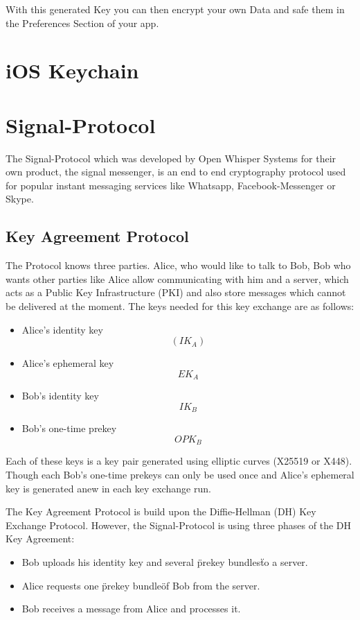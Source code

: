 \documentclass[12pt,oneside,a4paper,parskip]{scrbook}
\begin{document}
With this generated Key you can then encrypt your own Data and safe them in the Preferences Section of your app.

\section{iOS Keychain}


\section{Signal-Protocol}

The Signal-Protocol which was developed by Open Whisper Systems for their own product, the signal messenger, is an end to end cryptography protocol used for
popular instant messaging services like Whatsapp, Facebook-Messenger or Skype.

\parencite{cohn-gordon_formal_2017}
\newline

\subsection{Key Agreement Protocol}
The Protocol knows three parties. Alice, who would like to talk to Bob, Bob who wants other parties like Alice allow communicating with him and a server, which acts as a
Public Key Infrastructure (PKI) and also store messages which cannot be delivered at the moment. The keys needed for this key exchange are as follows:
 \begin{itemize}
   \item Alice's identity key \[  (IK_{A}) \]
   \item Alice's ephemeral key \[  {EK_{A}} \]
   \item Bob's identity key \[  {IK_{B}} \] 
   \item Bob's one-time prekey \[  {OPK_{B}} \]
 \end{itemize}

Each of these keys is a key pair generated using elliptic curves (X25519 or X448). Though each Bob's one-time prekeys can only be used once and Alice's ephemeral key is generated anew in each key exchange run.

The Key Agreement Protocol is build upon the Diffie-Hellman (DH) Key Exchange Protocol. However, the Signal-Protocol is using three phases of the DH Key Agreement:
\begin{itemize}
  \item Bob uploads his identity key and several \"prekey bundles\" to a server.
  \item Alice requests one \"prekey bundle\" of Bob from the server.
  \item Bob receives a message from Alice and processes it.
\end{itemize}
\end{document}
